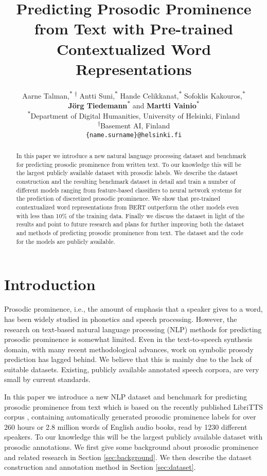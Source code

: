 \documentclass[11pt]{article}
\title{Predicting Prosodic Prominence from Text with Pre-trained Contextualized Word Representations}
\author{
Aarne Talman,\textsuperscript{$\ast$ $\dagger$} Antti Suni,\textsuperscript{$\ast$} Hande Celikkanat,\textsuperscript{$\ast$} Sofoklis Kakouros,\textsuperscript{$\ast$}\\{\bf J\"org Tiedemann\textsuperscript{$\ast$}} and {\bf Martti Vainio\textsuperscript{$\ast$}}\\
\textsuperscript{$\ast$}Department of Digital Humanities, University of Helsinki, Finland\\
\textsuperscript{$\dagger$}Basement AI, Finland \\
\texttt{\{name.surname\}@helsinki.fi}
}
\date{}
\begin{document}
\maketitle

\begin{abstract}
 In this paper we introduce a new natural language processing dataset and benchmark for predicting prosodic prominence from written text. To our knowledge this will be the largest publicly available dataset with prosodic labels. We describe the dataset construction and the resulting benchmark dataset in detail and train a number of different models ranging from feature-based classifiers to neural network systems for the prediction of discretized prosodic prominence. We show that pre-trained contextualized word representations from BERT outperform the other models even with less than 10\% of the training data. Finally we discuss the dataset in light of the results and point to future research and plans for further improving both the dataset and methods of predicting prosodic prominence from text. The dataset and the code for the models are publicly available.
\end{abstract}

\section{Introduction}
Prosodic prominence, i.e., the amount of emphasis that a speaker gives to a word, has been widely studied in phonetics and speech processing. However, the research on text-based natural language processing (NLP) methods for predicting prosodic prominence is somewhat limited. Even in the text-to-speech synthesis domain, with many recent methodological advances, work on symbolic prosody prediction has lagged behind. We believe that this is mainly due to the lack of suitable datasets. Existing, publicly available annotated speech corpora, are very small by current standards.

In this paper we introduce a new NLP dataset and benchmark for predicting prosodic prominence from text which is based on the recently published LibriTTS corpus \cite{zen2019libritts}, containing automatically generated prosodic prominence labels for over 260 hours or 2.8 million words of English audio books, read by 1230 different speakers. To our knowledge this will be the largest publicly available dataset with prosodic annotations. We first give some background about prosodic prominence and related research in Section \ref{sec:background}. We then describe the dataset construction and annotation method in Section \ref{sec:dataset}.
\end{document}
